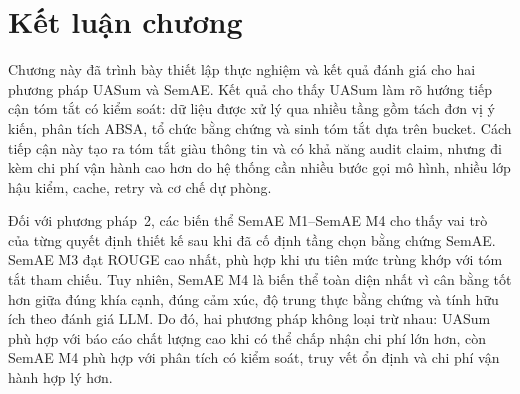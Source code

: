 \section{Kết luận chương}

Chương này đã trình bày thiết lập thực nghiệm và kết quả đánh giá cho hai
phương pháp UASum và SemAE. Kết quả cho thấy UASum làm rõ hướng tiếp cận tóm
tắt có kiểm soát: dữ liệu được xử lý qua nhiều tầng gồm tách đơn vị ý kiến,
phân tích ABSA, tổ chức bằng chứng và sinh tóm tắt dựa trên bucket. Cách tiếp
cận này tạo ra tóm tắt giàu thông tin và có khả năng audit claim, nhưng đi kèm
chi phí vận hành cao hơn do hệ thống cần nhiều bước gọi mô hình, nhiều lớp hậu
kiểm, cache, retry và cơ chế dự phòng.

Đối với phương pháp~2, các biến thể SemAE M1--SemAE M4 cho thấy vai trò của từng quyết định thiết kế sau khi đã cố định tầng chọn bằng chứng SemAE. SemAE M3 đạt ROUGE cao nhất, phù hợp khi ưu tiên mức trùng khớp với tóm tắt tham chiếu. Tuy nhiên, SemAE M4 là biến thể toàn diện nhất vì cân bằng tốt hơn giữa đúng khía cạnh, đúng cảm xúc, độ trung thực bằng chứng và tính hữu ích theo đánh giá LLM. Do đó, hai phương pháp không loại trừ nhau: UASum phù hợp với báo cáo chất lượng cao khi có thể chấp nhận chi phí lớn hơn, còn SemAE M4 phù hợp với phân tích có kiểm soát, truy vết ổn định và chi phí vận hành hợp lý hơn.
